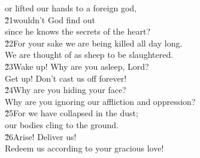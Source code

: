 \begin{poetry}
\poemll    or lifted our hands to a foreign god, \\
\poeml \v{21}wouldn't God find out \\
\poemll    since he knows the secrets of the heart? \\
\poeml \v{22}For your sake we are being killed all day long. \\
\poemll    We are thought of as sheep to be slaughtered. \\
\poeml \v{23}Wake up! Why are you asleep, Lord? \\
\poemll    Get up! Don't cast us off forever! \\
\poeml \v{24}Why are you hiding your face? \\
\poemll    Why are you ignoring our affliction and oppression? \\
\poeml \v{25}For we have collapsed in the dust; \\
\poemll    our bodies cling to the ground. \\
\poeml \v{26}Arise! Deliver us! \\
\poemll    Redeem us according to your gracious love!
\end{poetry}


